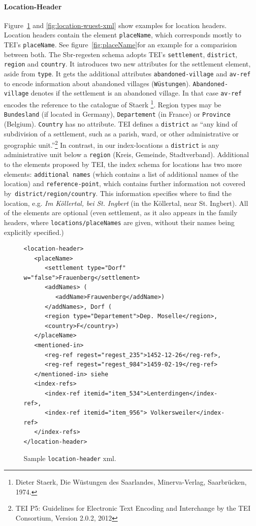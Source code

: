 \paragraph{Location-Header}
Figure~\ref{fig:location-header-xml} and \ref{fig:location-wuest-xml} show examples for location headers. Location headers contain the element \texttt{placeName}, which corresponds mostly to TEI's \texttt{placeName}. See figure~\ref{fig:placeName}for an example for a comparision between both. The Sbr-regesten schema adopts TEI's \texttt{settlement}, \texttt{district}, \texttt{region} and \texttt{country}. It introduces two new attributes for the settlement element, aside from \texttt{type}. It gets the additional attributes \texttt{abandoned-village} and \texttt{av-ref} to encode information about abandoned villages (\texttt{Wüstungen}). \texttt{Abandoned-village} denotes if the settlement is an abandoned village. In that case \texttt{av-ref} encodes the reference to the catalogue of Staerk \footnote{Dieter Staerk, Die Wüstungen des Saarlandes, Minerva-Verlag, Saarbrücken, 1974.}. Region types may be \texttt{Bundesland} (if located in Germany), \texttt{Departement} (in France) or \texttt{Province} (Belgium). \texttt{Country} has no attribute. TEI defines a \texttt{district} as “any kind of subdivision of a settlement, such as a parish, ward, or other administrative or geographic unit.”\footnote{TEI P5: Guidelines for Electronic Text Encoding and Interchange by the TEI Consortium, Version 2.0.2, 2012} In contrast, in our index-locations a \texttt{district} is any administrative unit below a \texttt{region} (Kreis, Gemeinde, Stadtverband).
Additional to the elements proposed by TEI, the index schema for locations has two more elements: \texttt{additional names} (which contains a list of additional names of the location) and \texttt{reference-point}, which contains further information not covered by\texttt{ district/region/country}. This information specifies where to find the location, e.g. \textit{Im Köllertal, bei St. Ingbert} (in the Köllertal, near St. Ingbert). All of the elements are optional (even settlement, as it also appears in the family headers, where \texttt{locations/placeNames} are given, without their names being explicitly specified.)   

\begin{figure}[H]
\centering
\begin{verbatim}
<location-header>
   <placeName>
      <settlement type="Dorf" w="false">Frauenberg</settlement>
      <addNames> (
         <addName>Frauwenberg</addName>)
      </addNames>, Dorf (
      <region type="Departement">Dep. Moselle</region>, 
      <country>F</country>) 
   </placeName>
   <mentioned-in>
      <reg-ref regest="regest_235">1452-12-26</reg-ref>, 
      <reg-ref regest="regest_984">1459-02-19</reg-ref>
   </mentioned-in> siehe 
   <index-refs>
      <index-ref itemid="item_534">Lenterdingen</index-ref>,
      <index-ref itemid="item_956"> Volkersweiler</index-ref>
   </index-refs>
</location-header>
\end{verbatim}
\label{fig:location-header-xml}
\caption{Sample \texttt{location-header} xml.}
\end{figure}

